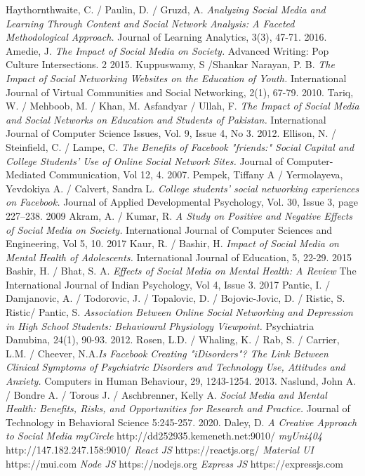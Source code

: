 \documentclass[lettersize,journal]{IEEEtran}
\begin{document}
\begin{thebibliography}{}
    Haythornthwaite, C. / Paulin, D. / Gruzd, A. {\it{Analyzing Social Media
        and Learning Through Content and Social Network Analysis: A Faceted
        Methodological Approach.}} Journal of Learning Analytics, 3(3), 47-71.
        2016.
        Amedie, J. {\it{The Impact of Social Media on Society.}}
        Advanced Writing: Pop Culture Intersections. 2
        2015.
	Kuppuswamy, S /Shankar Narayan, P. B. {\it{The Impact of Social Networking Websites on the Education of Youth.}}
	International Journal of Virtual Communities and Social Networking, 2(1), 67-79.
	2010.
	Tariq, W. / Mehboob, M. / Khan, M. Asfandyar / Ullah, F. {\it{The Impact of Social Media and Social Networks on Education and Students of Pakistan.}} International Journal of Computer Science Issues, Vol. 9, Issue 4, No 3.
	2012.
	Ellison, N. / Steinfield, C. / Lampe, C. {\it{The Benefits of Facebook "friends:" Social Capital and College Students' Use of Online Social Network Sites.}} Journal of Computer-Mediated Communication, Vol 12, 4.
	2007.
	Pempek, Tiffany A / Yermolayeva, Yevdokiya A. / Calvert, Sandra L. {\it{College students’ social networking experiences on
		Facebook.}} Journal of Applied Developmental Psychology, Vol. 30, Issue 3, page 227–238.
	2009
	Akram, A. / Kumar, R. {\it{A Study on Positive and Negative Effects of Social Media on Society.}}
	International Journal of Computer Sciences and Engineering, Vol 5, 10.
	2017
	Kaur, R. / Bashir, H. {\it{Impact of Social Media on Mental Health of Adolescents.}}
	International Journal of Education, 5, 22-29.
	2015
	Bashir, H. / Bhat, S. A. {\it{Effects of Social Media on Mental Health: A Review}}
	The International Journal of Indian Psychology, Vol 4, Issue 3.
	2017
	Pantic, I. / Damjanovic, A. / Todorovic, J. / Topalovic, D. / Bojovic-Jovic, D. / Ristic, S. Ristic/ Pantic, S.
	{\it{Association Between Online Social Networking and Depression in High School Students: Behavioural Physiology Viewpoint.}}
	Psychiatria Danubina, 24(1), 90-93.
	2012.
	Rosen, L.D. / Whaling, K. / Rab, S. / Carrier, L.M. / Cheever, N.A.{\it{Is Facebook Creating "iDisorders"? The Link Between Clinical Symptoms of Psychiatric Disorders and Technology Use, Attitudes and Anxiety.}} Computers in Human Behaviour, 29, 1243-1254.
	2013.
	Naslund, John A. / Bondre A. / Torous J. / Aschbrenner, Kelly A. {\it{Social Media and Mental Health: Benefits, Risks, and Opportunities for Research and Practice.}} Journal of Technology in Behavioral Science 5:245-257.
	2020.
	Daley, D. {\it{A Creative Approach to Social Media}}
	{\it{myCircle}}
	http://dd252935.kemeneth.net:9010/
    {\it{myUni404}}
    http://147.182.247.158:9010/
	{\it{React JS}}
	https://reactjs.org/
	{\it{Material UI}}
	https://mui.com
	{\it{Node JS}}
	https://nodejs.org
	{\it{Express JS}}
	https://expressjs.com
\end{thebibliography}
\end{document}
